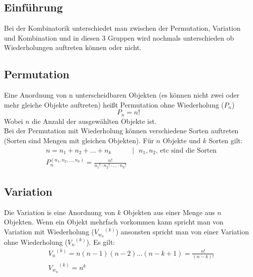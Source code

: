 \documentclass[a4paper]{scrartcl}
\begin{document}
        \subsection{Einführung}
            Bei der Kombinatorik unterschiedet man zwischen der Permutation, Variation und Kombination und in diesen 3 Gruppen wird nochmals unterschieden ob Wiederholungen auftreten 
            können oder nicht. 
        \subsection{Permutation}
            Eine Anordnung von n unterscheidbaren Objekten (es können nicht zwei oder mehr gleiche Objekte auftreten) heißt Permutation ohne Wiederholung (\(P_n\))
            \begin{equation*}
                P_n = n!
            \end{equation*} 
            Wobei \(n\) die Anzahl der ausgewählten Objekte ist. \\
            Bei der Permutation mit Wiederholung können verschiedene Sorten auftreten (Sorten sind Mengen mit gleichen Objekten). Für \(n\) Objekte und \(k\) Sorten gilt:
            \begin{equation*}
                \begin{aligned}
                    & n = n_1 + n_2 + \ldots + n_k & | \text{ \(n_1,n_2\), etc sind die Sorten} \\
                    & P_n^{(n_1,n_2, \ldots ,n_k)} = \frac{n!}{n_1! \cdot n_2! \cdot ... \cdot n_k!}
                \end{aligned}
            \end{equation*} 
        \subsection{Variation}
            Die Variation is eine Anordnung von \(k\) Objekten aus einer Menge aus \(n\) Objekten. Wenn ein Objekt mehrfach vorkommen kann spricht man 
            von Variation mit Wiederholung (\({V_{w_n}}^{(k)}\)) ansonsten spricht man von einer Variation ohne Wiederholung (\({V_{n}}^{(k)}\)). Es gilt:
            \begin{equation*}
                \begin{aligned}
                    & {V_{n}}^{(k)} = n(n-1)(n-2) \ldots (n-k+1) = \frac{n!}{(n-k)!} \\
                    & {V_{w_n}}^{(k)} = n^k 
                \end{aligned}
            \end{equation*}
\end{document}
